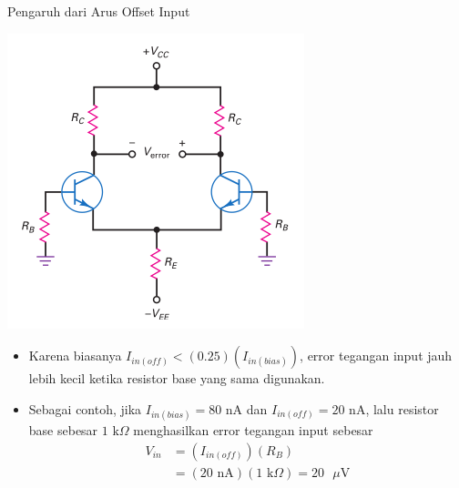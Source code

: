 \documentclass[aspectratio=169]{beamer}
\begin{document}
\begin{frame}{Pengaruh dari Arus Offset Input}
	\begin{multicols}{2}
		\begin{center}
			\includegraphics[height=0.7\textheight]{gambar/01.diff-amp/01.equal_base_resistance_on_other_side_reduces_error}
		\end{center}
		\columnbreak
		\begin{itemize}
			\item Karena biasanya $ I_{in(off)}  < (0.25)( I_{in(bias)})$, error tegangan input jauh lebih kecil ketika resistor base yang sama digunakan.
			\item Sebagai contoh, jika $ I_{in(bias)} = 80 \text{ nA} $ dan $ I_{in(off)} = 20 \text{ nA} $, lalu resistor base sebesar $ 1 \text{ k}\Omega $ menghasilkan error tegangan input sebesar
			\begin{align*}
				V_{in} &= (I_{in(off)})(R_B) \\
				&= (20 \text{ nA})(1 \text{ k}\Omega) = 20 \text{ }\mu\text{V}\\
			\end{align*}
		\end{itemize}
	\end{multicols}
\end{frame}
\end{document}
